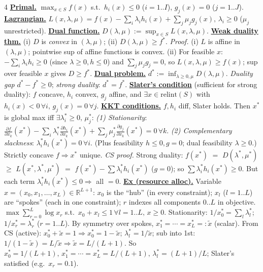 \documentclass[10pt,landscape,letterpaper]{article}
\let\oldtextbf\textbf
\renewcommand{\textbf}[1]{\uline{\oldtextbf{#1}}}
\begin{document}
\begin{multicols*}{4}
\textbf{Primal.} \(\max_{x\in S}f(x)\) s.t.\ \(h_i(x)\!\le\!0\) (\(i{=}1..I\)), \(g_j(x){=}0\) (\(j{=}1..J\)).
\textbf{Lagrangian.} \(L(x,\lambda,\mu){=}f(x){-}\!\sum_i\!\lambda_i h_i(x){+}\!\sum_j\!\mu_j g_j(x),\,\lambda_i{\ge}0\) (\(\mu_j\) unrestricted).
\textbf{Dual function.} \(D(\lambda,\mu){:=}\sup_{x\in S}L(x,\lambda,\mu)\).
\textbf{Weak duality thm.} (i) \(D\) is \emph{convex} in \((\lambda,\mu)\); (ii) \(D(\lambda,\mu)\ge f^*\).
\emph{Proof.} (i) \(L\) is affine in \((\lambda,\mu)\); pointwise sup of affine functions is convex.
(ii) For feasible \(x\): \(-\sum_i\lambda_i h_i\ge 0\) (since \(\lambda{\ge}0,h{\le}0\)) and \(\sum_j\mu_j g_j{=}0\), so \(L(x,\lambda,\mu)\ge f(x)\); sup over feasible \(x\) gives \(D\ge f^*\).
\textbf{Dual problem.} \(d^*{:=}\inf_{\lambda\ge 0,\mu}D(\lambda,\mu)\). \emph{Duality gap} \(d^*{-}f^*\!\ge\!0\); \emph{strong duality}: \(d^*{=}f^*\).
\textbf{Slater's condition} (sufficient for strong duality): \(f\) concave, \(h_i\) convex, \(g_j\) affine, and \(\exists x\in\mathrm{relint}(S)\) with \(h_i(x){<}0\,\forall i,\,g_j(x){=}0\,\forall j\).
\textbf{KKT conditions.} \(f,h_i\) diff, Slater holds. Then \(x^*\) is global max iff \(\exists\lambda_i^*{\ge}0,\,\mu_j^*\):
\emph{(1) Stationarity}: \(\tfrac{\partial f}{\partial x_k}(x^*){-}\!\sum_i\!\lambda_i^*\tfrac{\partial h_i}{\partial x_k}(x^*){+}\!\sum_j\!\mu_j^*\tfrac{\partial g_j}{\partial x_k}(x^*){=}0\,\forall k\).
\emph{(2) Complementary slackness}: \(\lambda_i^* h_i(x^*){=}0\,\forall i\).
(Plus feasibility \(h{\le}0,g{=}0\); dual feasibility \(\lambda{\ge}0\).) Strictly concave \(f\Rightarrow x^*\) unique.
\emph{CS proof.} Strong duality: \(f(x^*)\) \(=\) \(D(\lambda^*,\mu^*)\) \(\ge\) \(L(x^*,\lambda^*,\mu^*)\) \(=\) \(f(x^*){-}\!\sum\!\lambda_i^*h_i(x^*)\) (\(g{=}0\)); so \(\sum\lambda_i^*h_i(x^*){\ge}0\). But each term \(\lambda_i^*h_i(x^*){\le}0\Rightarrow\) all \({=}0\).
\textbf{Ex (resource alloc).} Variable \(x{=}(x_0,x_1,\ldots,x_L)\!\in\!\mathbb R^{L+1}\): \(x_0\) is the ``hub'' (in every constraint); \(x_l\) (\(l{=}1..L\)) are ``spokes'' (each in one constraint); \(r\) indexes all components \(0..L\) in objective.
\(\max\!\sum_{r=0}^L\!\log x_r\) s.t.\ \(x_0{+}x_l{\le}1\,\forall l{=}1..L,\,x{\ge}0\).
Stationarity: \(1/x_0^*{=}\!\sum_l\!\lambda_l^*\); \(1/x_r^*{=}\lambda_r^*\) (\(r{=}1..L\)). By symmetry over spokes, \(x_1^*{=}{\cdots}{=}x_L^*{=:}\tilde x\) (scalar).
From CS (active): \(x_0^*{+}\tilde x{=}1\Rightarrow x_0^*{=}1{-}\tilde x\); \(\lambda_l^*{=}1/\tilde x\); sub into 1st: \(1/(1{-}\tilde x){=}L/\tilde x\Rightarrow\tilde x{=}L/(L{+}1)\).
So \(x_0^*{=}1/(L{+}1),\,x_1^*{=}{\cdots}{=}x_L^*{=}L/(L{+}1),\,\lambda_l^*{=}(L{+}1)/L\); Slater's satisfied (e.g.\ \(x_r{=}0.1\)).

\end{multicols*}
\end{document}
